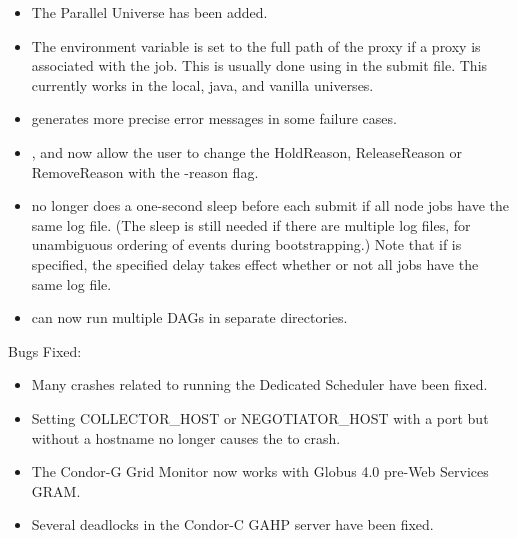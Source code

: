 \begin{itemize}

\item The Parallel Universe has been added.

\item 
{}
The environment variable  is set to the
full path of the proxy if a proxy is associated with the job.
This is usually done using  in the submit file.
This currently works in the local, java, and vanilla universes.

\item {} generates more precise error messages in 
some failure cases.

\item {},  and  now allow the user
to change the HoldReason, ReleaseReason or RemoveReason with the -reason
flag.

\item {} no longer does a one-second sleep before each
submit if all node jobs have the same log file.  (The sleep is still
needed if there are multiple log files, for unambiguous ordering of
events during bootstrapping.)  Note that if 
is specified, the specified delay takes effect whether or not all
jobs have the same log file.

\item {} can now run multiple DAGs in separate directories.

\end{itemize}

\noindent Bugs Fixed:

\begin{itemize}

\item Many crashes related to running the Dedicated Scheduler have
been fixed.

\item Setting COLLECTOR\_HOST or NEGOTIATOR\_HOST with a port but without
a hostname no longer causes the  to crash.

\item The Condor-G Grid Monitor now works with Globus 4.0 pre-Web Services
GRAM.

\item Several deadlocks in the Condor-C GAHP server have been fixed.

\end{itemize}

